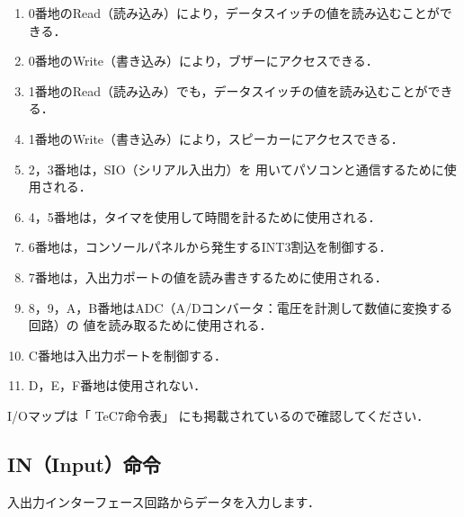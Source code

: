 \begin{enumerate}
\item 0番地のRead（読み込み）により，データスイッチの値を読み込むことができる．
\item 0番地のWrite（書き込み）により，ブザーにアクセスできる．
\item 1番地のRead（読み込み）でも，データスイッチの値を読み込むことができる．
\item 1番地のWrite（書き込み）により，スピーカーにアクセスできる．
\item 2，3番地は，SIO（シリアル入出力）を
  用いてパソコンと通信するために使用される．
\item 4，5番地は，タイマを使用して時間を計るために使用される．
\item 6番地は，コンソールパネルから発生するINT3割込を制御する．
\item 7番地は，入出力ポートの値を読み書きするために使用される．
\item 8，9，A，B番地はADC（A/Dコンバータ：電圧を計測して数値に変換する回路）の
  値を読み取るために使用される．
\item C番地は入出力ポートを制御する．
\item D，E，F番地は使用されない．
\end{enumerate}

I/Oマップは「 TeC7命令表」
にも掲載されているので確認してください．

\subsection{IN（Input）命令}
入出力インターフェース回路からデータを入力します．

